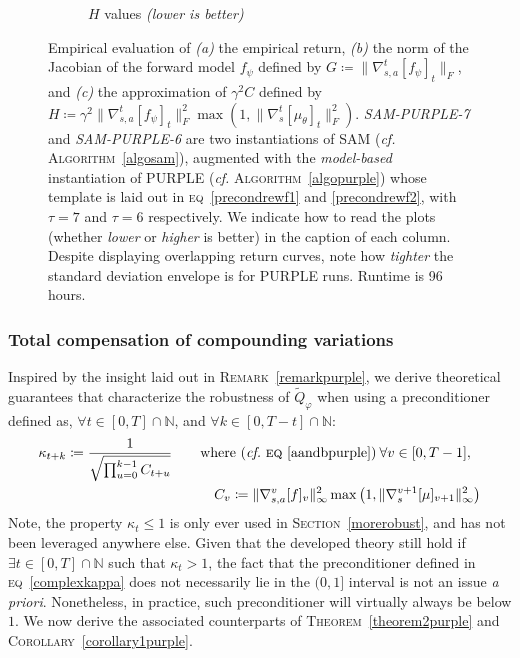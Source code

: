 \begin{figure}[H]
\begin{subfigure}[t]{0.33\textwidth}
    \caption{$H$ values \textit{(lower is better)}}
  \end{subfigure}
  \caption{Empirical evaluation of
  \textit{(a)} the empirical return,
  \textit{(b)} the norm of the Jacobian of the forward model $f_\psi$ defined by
  $G \coloneqq \lVert\nabla_{s,a}^t[f_\psi]_t\rVert _F$, and
  \textit{(c)} the approximation of $\gamma^2 C$ defined by
  $H \coloneqq \gamma^2 \lVert\nabla_{s,a}^t[f_\psi]_t\rVert _F^2 \max (1, \lVert\nabla_s^t[\mu_\theta]_t\rVert _F^2)$.
  \textit{SAM-PURPLE-7} and \textit{SAM-PURPLE-6} are two instantiations of SAM
  (\textit{cf.} \textsc{Algorithm}~\ref{algosam}),
  augmented with
  the \emph{model-based} instantiation of PURPLE
  (\textit{cf.} \textsc{Algorithm}~\ref{algopurple})
  whose template is laid out in
  \textsc{eq}~\ref{precondrewf1} and \ref{precondrewf2},
  with $\tau=7$ and $\tau=6$ respectively.
  We indicate how to read the plots (whether \textit{lower} or \textit{higher} is better) in the caption of
  each column.
  Despite displaying overlapping return curves, note how \emph{tighter} the standard deviation envelope is
  for PURPLE runs.
  Runtime is 96 hours.}
  \label{purplepsi}
\end{figure}

\subsubsection{Total compensation of compounding variations}

Inspired by the insight laid out in \textsc{Remark}~\ref{remarkpurple},
we derive theoretical guarantees that characterize the robustness of $\widetilde{Q}_\varphi$
when using a preconditioner defined as,
$\forall t \in [0, T] \cap \mathbb{N}$, and
$\forall k \in [0, T-t] \cap \mathbb{N}$:
\begin{align}
\kappa_{t+k} \coloneqq
\frac{1}{\sqrt{\prod_{u=0}^{k-1} C_{t+u}}}
\qquad &\text{where (\textit{cf.}~\textsc{eq}~\ref{aandbpurple})} \:
\forall v \in [0, T-1], \nonumber \\
&\quad C_v \coloneqq \lVert\nabla_{s,a}^v[f]_v\rVert _\infty^2
\max \big(1, \lVert\nabla_s^{v+1}[\mu]_{v+1}\rVert _\infty^2\big)
\label{complexkappa}
\end{align}
Note, the property $\kappa_t \leq 1$ is only ever used in \textsc{Section}~\ref{morerobust},
and has not been leveraged anywhere else.
Given that the developed theory still hold if $\exists t \in [0, T] \cap \mathbb{N}$ such that $\kappa_t > 1$,
the fact that the preconditioner defined in \textsc{eq}~\ref{complexkappa} does not necessarily lie in
the $(0,1]$ interval is not an issue \textit{a priori}. Nonetheless, in practice,
such preconditioner will virtually always be below $1$.
We now derive the associated counterparts of
\textsc{Theorem}~\ref{theorem2purple} and \textsc{Corollary}~\ref{corollary1purple}.

